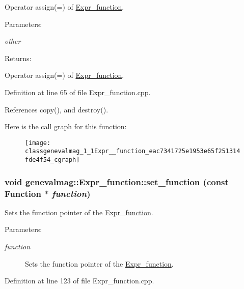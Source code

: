 Operator assign(=) of \hyperlink{classgenevalmag_1_1Expr__function}{Expr\_\-function}. \begin{Desc}
\item[Parameters:]
\begin{description}
\item[{\em other}]\end{description}
\end{Desc}
\begin{Desc}
\item[Returns:]\end{Desc}
Operator assign(=) of \hyperlink{classgenevalmag_1_1Expr__function}{Expr\_\-function}. 

Definition at line 65 of file Expr\_\-function.cpp.

References copy(), and destroy().

Here is the call graph for this function:\nopagebreak
\begin{figure}[H]
\begin{center}
\leavevmode
\texttt{[image: classgenevalmag\_1\_1Expr\_\_function\_eac7341725e1953e65f251314fde4f54\_cgraph]}
\end{center}
\end{figure}
\hypertarget{classgenevalmag_1_1Expr__function_9d3e5b95868a98b9014d0f1de4ac8ae8}{
\subsubsection[{set\_\-function}]{\setlength{\rightskip}{0pt plus 5cm}void genevalmag::Expr\_\-function::set\_\-function (const {\bf Function} $\ast$ {\em function})}}
\label{classgenevalmag_1_1Expr__function_9d3e5b95868a98b9014d0f1de4ac8ae8}


Sets the function pointer of the \hyperlink{classgenevalmag_1_1Expr__function}{Expr\_\-function}. \begin{Desc}
\item[Parameters:]
\begin{description}
\item[{\em function}]Sets the function pointer of the \hyperlink{classgenevalmag_1_1Expr__function}{Expr\_\-function}. \end{description}
\end{Desc}


Definition at line 123 of file Expr\_\-function.cpp.

